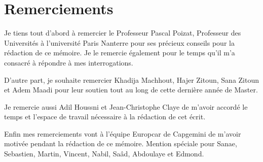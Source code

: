 \documentclass[openany,12pt]{book}
\begin{document}
\frontmatter

\chapter*{Remerciements}

Je tiens tout d'abord à remercier le Professeur Pascal Poizat, Professeur des Universités à l'université Paris Nanterre pour ses précieux conseils pour la rédaction de ce mémoire. Je le remercie également pour le temps qu'il m'a consacré à répondre à mes interrogations.

D'autre part, je souhaite remercier Khadija Machhout, Hajer Zitoun, Sana Zitoun et Adem Maadi pour leur soutien tout au long de cette dernière année de Master.

Je remercie aussi Adil Houssni et Jean-Christophe Claye de m'avoir accordé le temps et l'espace de travail nécessaire à la rédaction de cet écrit. 

Enfin mes remerciements vont à l'équipe Europcar de Capgemini de m'avoir motivée pendant la rédaction de ce mémoire. Mention spéciale pour Sanae, Sebastien, Martin, Vincent, Nabil, Saâd, Abdoulaye et Edmond. 

\tableofcontents
\listoffigures


\mainmatter
\pagestyle{fancy}




\appendix



\end{document}
